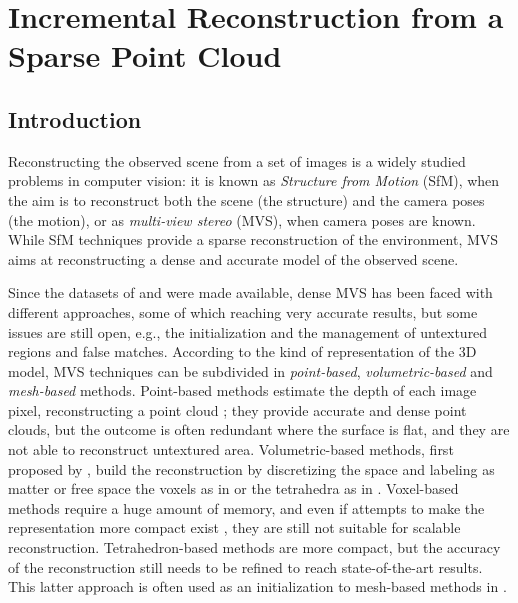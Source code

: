 \chapter{Incremental Reconstruction from a Sparse Point Cloud}





\section{Introduction}
\label{sec:intro}
Reconstructing the observed scene from a set of images is a widely studied problems in computer vision: it is known as \emph{Structure from Motion} (SfM), when the aim is to reconstruct both the scene (the structure) and the camera poses (the motion), or as \emph{multi-view stereo} (MVS), when camera poses are known.
While SfM techniques provide a sparse reconstruction of the environment, MVS aims at reconstructing a dense and accurate model of the observed scene. 

Since the datasets of \cite{Seitz_et_al06} and \cite{strecha2008} were made available, dense MVS has been faced with different approaches, some of which reaching very accurate results, but some issues are still open, e.g., the initialization and the management of untextured regions and false matches.
According to the kind of representation of the 3D model, MVS techniques can be subdivided in \emph{point-based}, \emph{volumetric-based} and \emph{mesh-based} methods.
Point-based methods estimate the depth of each image pixel, reconstructing a point cloud \cite{Fu10,Tola12}; they provide accurate and dense point clouds, but the outcome is often redundant where the surface is flat, and they are not able to reconstruct untextured area.
Volumetric-based methods, first proposed by \cite{curless1996volumetric}, build the reconstruction by discretizing the space and labeling as matter or free space the voxels as in \cite{curless1996volumetric} or the tetrahedra as in \cite{labatut2007efficient}.
Voxel-based methods  require a huge amount of memory, and even if attempts to make the representation more compact exist \cite{steinbrucker2014volumetric}, they are still not suitable for scalable reconstruction.
Tetrahedron-based methods are more compact, but the accuracy of the reconstruction still needs to be refined to reach state-of-the-art results.
This latter approach is often used as an initialization to mesh-based methods in \cite{vu_et_al_2012,hiep2009towards,salman2010surface}.

